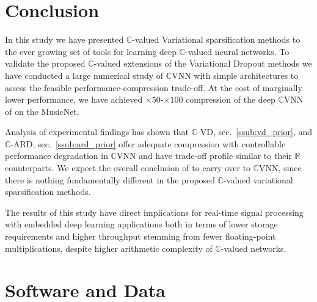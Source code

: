 \documentclass[a4paper,10pt,twocolumn]{article}
\newcommand{\real}{\mathbb{R}}
\newcommand{\cplx}{\mathbb{C}}
\begin{document}


\section{Conclusion} %
\label{sec:conclusion}

In this study we have presented $\cplx$-valued Variational sparsification methods to
the ever growing set of tools for learning deep $\cplx$-valued neural networks. To
validate the proposed $\cplx$-valued extensions of the Variational Dropout methods
\citep{molchanov_variational_2017,kharitonov_variational_2018} we have conducted a
large numerical study of $\cplx$VNN with simple architectures to assess the feasible
performance-compression trade-off. At the cost of marginally lower performance, we have
achieved $\times50$-$\times100$ compression of the deep $\cplx$VNN of \citet{trabelsi_deep_2018}
on the MusicNet.

Analysis of experimental findings has shown that $\cplx$-VD, sec.~\ref{ssub:vd_prior},
and $\cplx$-ARD, sec.~\ref{ssub:ard_prior} offer adequate compression with controllable
performance degradation in $\cplx$VNN and have trade-off profile similar to their $\real$
counterparts.
We expect the overall conclusion of \citet{gale_state_2019} to carry over to $\cplx$VNN,
since there is nothing fundamentally different in the proposed $\cplx$-valued variational
sparsification methods.

The results of this study have direct implications for real-time signal processing with
embedded deep learning applications both in terms of lower storage requirements and higher
throughput stemming from fewer floating-point multiplications, despite higher arithmetic
complexity of $\cplx$-valued networks.


\section*{Software and Data} %
\label{sec:software_and_data}
\end{document}
